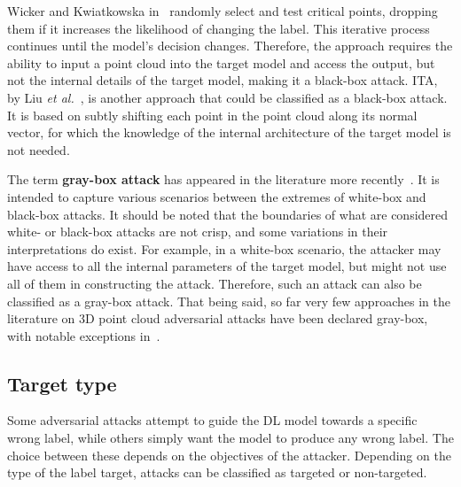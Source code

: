 \documentclass{ieeeaccess}
\def\etal{\textit{et al.}}
\begin{document}
Wicker and Kwiatkowska in~\cite{wicker2019robustness} randomly select and test critical points, dropping them if it increases the likelihood of changing the label. This iterative process continues until the model's decision changes. Therefore, the approach requires the ability to input a point cloud into the target model and access the output, but not the internal details of the target model, making it a black-box attack. ITA, by Liu \etal~\cite{liu2022imperceptible}, is another approach that could be classified as a black-box attack. It is based on subtly shifting each point in the point cloud along its normal vector, for which the knowledge of the internal architecture of the target model is not needed.  

The term \textbf{gray-box attack} has appeared in the literature more recently~\cite{Vivek_2018_ECCV}. It is intended to capture various scenarios between the extremes of white-box and black-box attacks. It should be noted that the boundaries of what are considered white- or black-box attacks are not crisp, and some variations in their interpretations do exist. For example, in a white-box scenario, the attacker may have access to all the internal parameters of the target model, but might not use all of them in constructing the attack. Therefore, such an attack can also be classified as a gray-box attack. That being said, so far very few approaches in the literature on 3D point cloud adversarial attacks have been declared gray-box, with notable exceptions in~\cite{dong2020self,Lang_3DV_2021}.


\subsection{Target type}
\label{subsubsec:Target type }

Some adversarial attacks attempt to guide the DL model towards a specific wrong label, while others simply want the model to produce any wrong label. The choice between these depends on the objectives of the attacker. Depending on the type of the label target, attacks can be classified as targeted or non-targeted.
\end{document}
